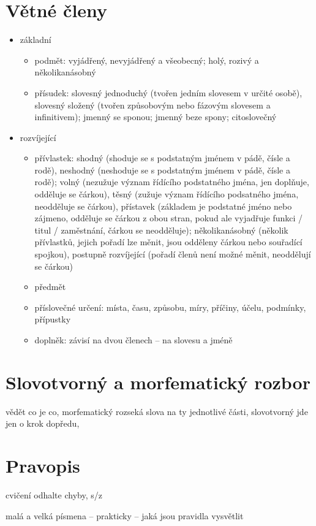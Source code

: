 \documentclass{memoir}
\begin{document}
\section*{Větné členy}
\begin{itemize}
\item základní
\begin{itemize}
\item podmět: vyjádřený, nevyjádřený a všeobecný; holý, rozivý a několikanásobný
\item přísudek: slovesný jednoduchý (tvořen jedním slovesem v určité osobě), slovesný složený (tvořen způsobovým nebo fázovým slovesem a infinitivem); jmenný se sponou; jmenný beze spony; citoslovečný
\end{itemize}
\item rozvíjející
\begin{itemize}
\item přívlastek: shodný (shoduje se s podstatným jménem v pádě, čísle a rodě), neshodný (neshoduje se s podstatným jménem v pádě, čísle a rodě); volný (nezužuje význam řídícího podstatného jména, jen doplňuje, odděluje se čárkou), těsný (zužuje význam řídícího podsatného jména, neodděluje se čárkou), přístavek (základem je podstatné jméno nebo zájmeno, odděluje se čárkou z obou stran, pokud ale vyjadřuje funkci / titul / zaměstnání, čárkou se neodděluje); několikanásobný (několik přívlastků, jejich pořadí lze měnit, jsou odděleny čárkou nebo souřadící spojkou), postupně rozvíjející (pořadí členů není možné měnit, neoddělují se čárkou)
\item předmět
\item příslovečné určení: místa, času, způsobu, míry, příčiny, účelu, podmínky, přípustky
\item doplněk: závisí na dvou členech -- na slovesu a jméně
\end{itemize}
\end{itemize}

\section*{Slovotvorný a morfematický rozbor}
vědět co je co, morfematický rozseká slova na ty jednotlivé části, slovotvorný jde jen o krok dopředu,


\section*{Pravopis}
cvičení odhalte chyby, s/z

malá a velká písmena – prakticky – jaká jsou pravidla vysvětlit
\end{document}
